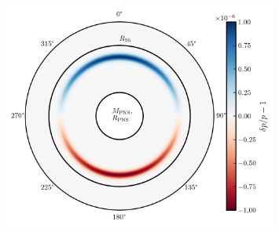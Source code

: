 \documentclass{beamer}
\begin{document}
\appendix

\begin{frame}

  \begin{figure}[htb!]
    \centering
    \includegraphics[width=0.8\textwidth]{pert.png}
  \end{figure}

\end{frame}
\end{document}
